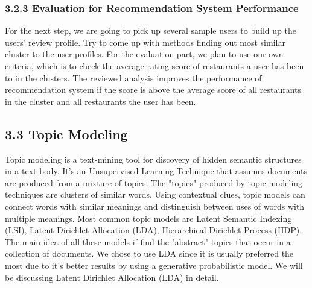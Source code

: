 \documentclass{neu_handout}
\begin{document}
\subsubsection*{3.2.3 Evaluation for Recommendation System Performance}
For the next step, we are going to pick up several sample users to build up the users’ review profile. Try to come up with methods finding out most similar cluster to the user profiles. For the evaluation part, we plan to use our own criteria, which is to check the average rating score of restaurants a user has been to in the clusters. The reviewed analysis improves the performance of recommendation system if the score is above the average score of all restaurants in the cluster and all restaurants the user has been. 
 
\subsection*{3.3 Topic Modeling}

Topic modeling is a text-mining tool for discovery of hidden semantic structures in a text body. It's an Unsupervised Learning Technique that assumes documents are produced from a mixture of topics. The "topics" produced by topic modeling techniques are clusters of similar words. Using contextual clues, topic models can connect words with similar meanings and distinguish between uses of words with multiple meanings. 
Most common topic models are Latent Semantic Indexing (LSI), Latent Dirichlet Allocation (LDA), Hierarchical Dirichlet Process (HDP). The main idea of all these models if find the "abstract" topics that occur in a collection of documents. We chose to use LDA since it is usually preferred the most due to it's better results by using a generative probabilistic model. We will be discussing Latent Dirichlet Allocation (LDA) in detail.
\end{document}
